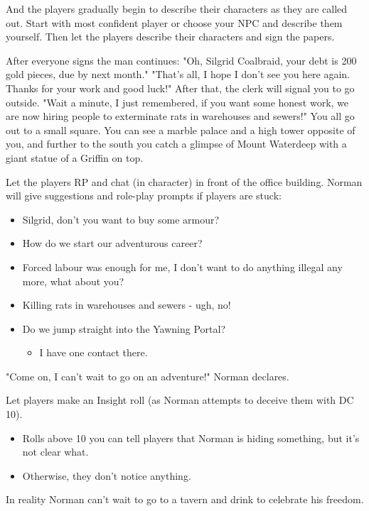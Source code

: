\documentclass[10pt,onecolumn,twoside,openany,bg=full,layout=true]{dndbook}
\begin{document}
And the players gradually begin to describe their characters as they are called out.
Start with most confident player or choose your NPC and describe them yourself.
Then let the players describe their characters and sign the papers.
\begin{DndReadAloud}
After everyone signs the man continues:
"Oh, Silgrid Coalbraid, your debt is 200 gold pieces, due by next month."
"That's all, I hope I don't see you here again.
  Thanks for your work and good luck!"
  After that, the clerk will signal you to go outside.
"Wait a minute, I just remembered, if you want some honest work, we are now hiring people to exterminate rats in warehouses and sewers!"
You all go out to a small square.
You can see a marble palace and a high tower opposite of you, and further to the south you catch a glimpse of Mount Waterdeep with a giant statue of a Griffin on top.
\end{DndReadAloud}
Let the players RP and chat (in character) in front of the office building.
Norman will give suggestions and role-play prompts if players are stuck:
\begin{itemize}
  \item Silgrid, don't you want to buy some armour?
  \item How do we start our adventurous career?
  \item Forced labour was enough for me, I don’t want to do anything illegal any more, what about you?
  \item Killing rats in warehouses and sewers - ugh, no!
  \item Do we jump straight into the Yawning Portal?
  \begin{itemize}
    \item I have one contact there.
  \end{itemize}
\end{itemize}
\begin{DndReadAloud}
"Come on, I can't wait to go on an adventure!" Norman declares.
\end{DndReadAloud}
Let players make an Insight roll (as Norman attempts to deceive them with DC 10).
\begin{itemize}
\item Rolls above 10 you can tell players that Norman is hiding something, but it's not clear what.
\item Otherwise, they don't notice anything.
\end{itemize}
In reality Norman can't wait to go to a tavern and drink to celebrate his freedom.
\end{document}
